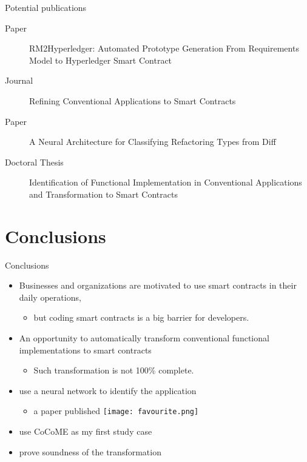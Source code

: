 \documentclass[xcolor=svgnames]{beamer}
\begin{document}
\begin{frame}{Potential publications}
\begin{description}
\item[Paper] RM2Hyperledger: Automated Prototype Generation From Requirements Model to Hyperledger Smart Contract
\item[Journal] Refining Conventional Applications to Smart Contracts
\item[Paper] A Neural Architecture for Classifying Refactoring Types from Diff
\item[Doctoral Thesis] Identification of Functional Implementation in Conventional Applications and Transformation to Smart Contracts
\end{description}
\end{frame}

\section{Conclusions}
\begin{frame}{Conclusions}

\begin{itemize}
\item Businesses and organizations are motivated to use smart contracts in their daily operations,
\begin{itemize}
\item but coding smart contracts is a big barrier for developers.
\end{itemize}

\item An opportunity to automatically transform conventional functional implementations to smart contracts
\begin{itemize}
\item Such transformation is not 100\%  complete.
\end{itemize}

\item use a neural network to identify the application
\begin{itemize}
\item a paper published \texttt{[image: favourite.png]}
\end{itemize}

\item use CoCoME as my first study case
\item prove soundness of the transformation
\end{itemize}


\end{frame}
\end{document}
